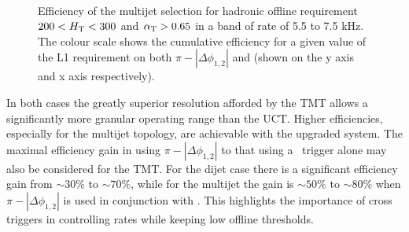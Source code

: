 \begin{figure}
\centering
	~
	\caption{Efficiency of the multijet selection for hadronic offline requirement $200 < \mbox{$H_\text{T}$} < 300$ and $\alpha_{\text{T}} > 0.65$
	in a band of rate of 5.5 to 7.5 kHz. The colour scale shows the cumulative efficiency for a given value of the 
	L1 requirement on both $\pi - |\Delta\phi_{1,2}|$ and \scalht (shown on the y axis and x axis respectively).}
	    \label{fig:multijet_cross}
\end{figure}

In both cases the greatly superior resolution afforded by the TMT allows a significantly
more granular operating range than the UCT. Higher efficiencies, especially for the multijet topology, 
are achievable with the upgraded system. The maximal efficiency gain in using $\pi - |\Delta\phi_{1,2}|$
to that using a \scalht~trigger alone may also be considered for the TMT. For the dijet case there is a 
significant efficiency gain from $\sim 30\%$ to $\sim 70\%$, while for the multijet the gain is 
$\sim 50\%$ to $\sim 80\%$ when $\pi - |\Delta\phi_{1,2}|$ is used in conjunction with \scalht.
This highlights the importance of cross triggers in controlling rates while 
keeping low offline thresholds.

